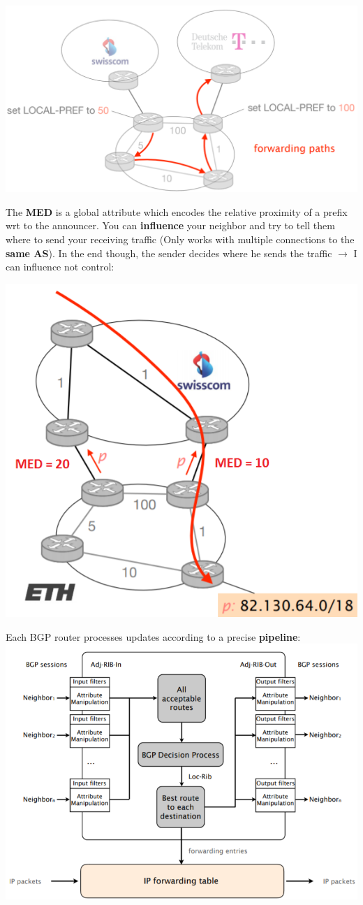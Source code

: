 \documentclass[a4paper, fontsize=8pt, landscape, DIV=1]{scrartcl}
\begin{document}
\begin{multicols*}{4}
		\includegraphics[width=\columnwidth]{images/Network_Layer/local_pref.png}
		\par 
		The \textbf{MED} is a global attribute which encodes the relative proximity of a prefix wrt to the announcer. You can \textbf{influence} your neighbor and try to tell them where to send your receiving traffic (Only works with multiple connections to the \textbf{same AS}). In the end though, the sender decides where he sends the traffic $\rightarrow$ I can influence not control:\\
		\begin{center}
			\includegraphics[width=0.7\columnwidth]{images/Network_Layer/med.png}
		\end{center}
		\par 
		Each BGP router processes updates according to a precise \textbf{pipeline}: 
		\includegraphics[width=\columnwidth]{images/Network_Layer/pipeline.png}

\end{multicols*}
\end{document}
